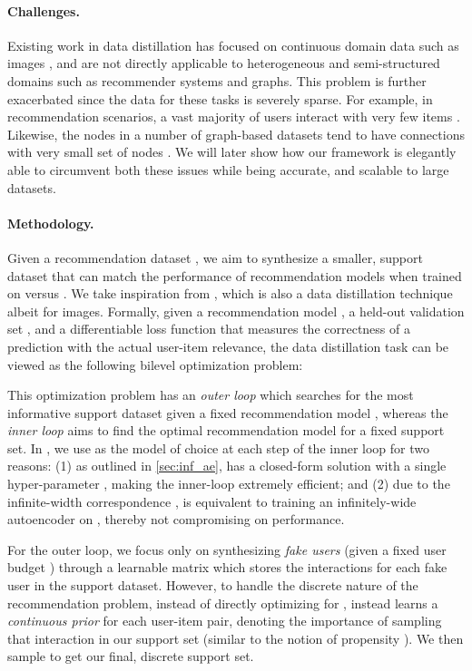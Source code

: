 \documentclass{article}
\begin{document}
\paragraph{Challenges.} Existing work in data distillation has focused on continuous domain data such as images \cite{kip, kip_conv, zhao_dc, zhao_dsa}, and are not directly applicable to heterogeneous and semi-structured domains such as recommender systems and graphs. This problem is further exacerbated since the data for these tasks is severely sparse. For example, in recommendation scenarios, a vast majority of users interact with very few items \cite{pfastre}. Likewise, the nodes in a number of graph-based datasets tend to have connections with very small set of nodes \cite{cold_brew}. We will later show how our \sampler framework is elegantly able to circumvent both these issues while being accurate, and scalable to large datasets.

\paragraph{Methodology.} Given a recommendation dataset , we aim to synthesize a smaller, support dataset  that can match the performance of recommendation models  when trained on  versus . We take inspiration from \cite{kip}, which is also a data distillation technique albeit for images. Formally, given a recommendation model , a held-out validation set , and a differentiable loss function  that measures the correctness of a prediction with the actual user-item relevance, the data distillation task can be viewed as the following bilevel optimization problem:



This optimization problem has an \emph{outer loop} which searches for the most informative support dataset  given a fixed recommendation model , whereas the \emph{inner loop} aims to find the optimal recommendation model for a fixed support set.
In \sampler, we use \model as the model of choice at each step of the inner loop for two reasons: (1) as outlined in \cref{sec:inf_ae}, \model has a closed-form solution with a single hyper-parameter , making the inner-loop extremely efficient; and (2) due to the infinite-width correspondence \cite{ntk, finite_vs_infinite_3}, \model is equivalent to training an infinitely-wide autoencoder on , thereby not compromising on performance.

For the outer loop, we focus only on synthesizing \emph{fake users} (given a fixed user budget ) through a learnable matrix  which stores the interactions for each fake user in the support dataset. However, to handle the discrete nature of the recommendation problem, instead of directly optimizing for , \sampler instead learns a \emph{continuous prior} for each user-item pair, denoting the importance of sampling that interaction in our support set (similar to the notion of propensity \cite{sachdeva_kdd20, rec_as_treatments}). We then sample  to get our final, discrete support set.
\end{document}
